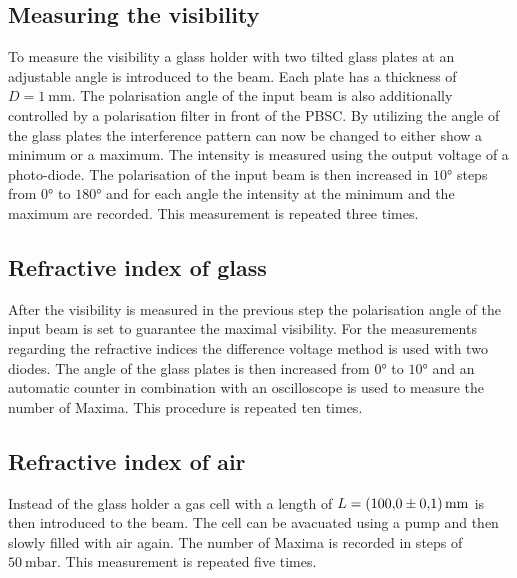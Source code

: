 \subsection{Measuring the visibility}
To measure the visibility a glass holder with two tilted glass plates at an adjustable angle is introduced to the beam. Each plate has a thickness of $D=\SI{1}{\milli\meter}$. The polarisation angle of the input beam is also additionally controlled by a polarisation filter in front of the PBSC. By utilizing the angle of the glass plates the interference pattern can now be changed to either show a minimum or a maximum. The intensity is measured using the output voltage of a photo-diode. The polarisation of the input beam is then increased in $10°$ steps from $0°$ to $180°$ and for each angle the intensity at the minimum and the maximum are recorded. This measurement is repeated three times.
\subsection{Refractive index of glass}
After the visibility is measured in the previous step the polarisation angle of the input beam is set to guarantee the maximal visibility. For the measurements regarding the refractive indices the difference voltage method is used with two diodes. The angle of the glass plates is then increased from $0°$ to $10°$ and an automatic counter in combination with an oscilloscope is used to measure the number of Maxima. This procedure is repeated ten times.
\subsection{Refractive index of air}
Instead of the glass holder a gas cell with a length of $L=\SI{100\pm0,1}{\milli\meter}$ is then introduced to the beam. The cell can be avacuated using a pump and then slowly filled with air again. The number of Maxima is recorded in steps of $\SI{50}{\milli\bar}$. This measurement is repeated five times.